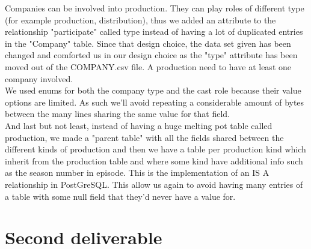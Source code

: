 \documentclass{article}
\begin{document}
    Companies can be involved into production. They can play roles of different type (for example production, distribution), thus we added an attribute to the relationship "participate" called type instead of having a lot of duplicated entries in the "Company" table. Since that design choice, the data set given has been changed and comforted us in our design choice as the "type" attribute has been moved out of the COMPANY.csv file. A production need to have at least one company involved.\\
    
    We used enums for both the company type and the cast role because their value options are limited. As such we'll avoid repeating a considerable amount of bytes between the many lines sharing the same value for that field.\\
    
    And last but not least, instead of having a huge melting pot table called production, we made a "parent table" with all the fields shared between the different kinds of production and then we have a table per production kind which inherit from the production table and where some kind have additional info such as the season number in episode. This is the implementation of an IS A relationship in PostGreSQL. This allow us again to avoid having many entries of a table with some null field that they'd never have a value for.

\pagebreak
\section{Second deliverable}
\end{document}
